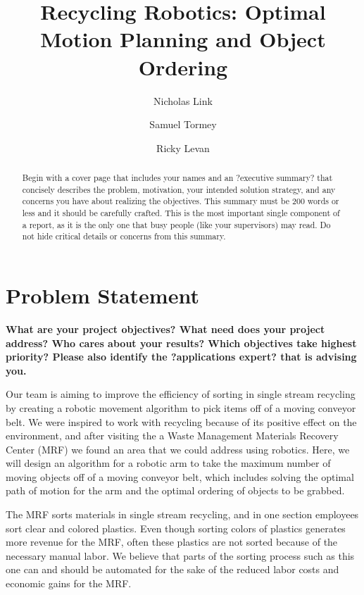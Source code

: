 \documentclass [11pt ]{ report}
\title{Recycling Robotics: Optimal Motion Planning and Object Ordering}
\author{Nicholas Link
\and Samuel Tormey
\and Ricky Levan}
\renewcommand{\b}{\textbf}
\begin{document}
\maketitle


\begin{abstract}
Begin with a cover page that includes your names and an ?executive summary? that concisely
describes the problem, motivation, your intended solution strategy, and any concerns you
have about realizing the objectives. This summary must be 200 words or less and it should
be carefully crafted.
This is the most important single component of a report, as it is the only one that busy people
(like your supervisors) may read. Do not hide critical details or concerns from this summary.
\end{abstract}

\section{Problem Statement}

\b{What are your project objectives? What need does your project address?
Who cares about your results? Which objectives take highest priority? Please also identify
the ?applications expert? that is advising you.} 

Our team is aiming to improve the efficiency of sorting in single stream recycling by creating a robotic movement algorithm to pick items off of a moving conveyor belt. We were inspired to work with recycling because of its positive effect on the environment, and after visiting the a Waste Management Materials Recovery Center (MRF) we found an area that we could address using robotics. Here, we will design an algorithm for a robotic arm to take the maximum number of moving objects off of a moving conveyor belt, which includes solving the optimal path of motion for the arm and the optimal ordering of objects to be grabbed.

The MRF sorts materials in single stream recycling, and in one section employees sort clear and colored plastics. Even though sorting colors of plastics generates more revenue for the MRF, often these plastics are not sorted because of the necessary manual labor. We believe that parts of the sorting process such as this one can and should be automated for the sake of the reduced labor costs and economic gains for the MRF. 
\end{document}
